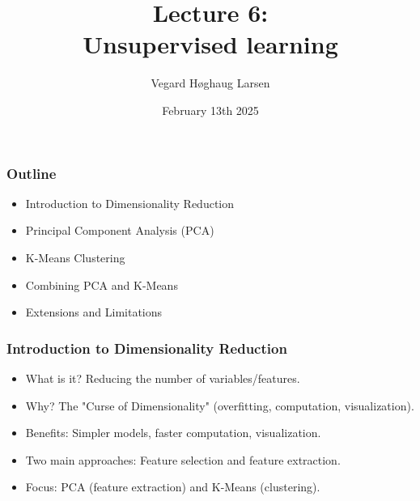 \documentclass[aspectratio=169]{beamer}
\title{Lecture 6:\\ Unsupervised learning}
\institute{GRA4160: Predictive modelling with machine learning}
\date{February 13th 2025}
\author{Vegard H\o ghaug Larsen}
\begin{document}
\maketitle

\begin{frame}
\frametitle{Outline}
\begin{itemize}
    \item Introduction to Dimensionality Reduction
    \item Principal Component Analysis (PCA)
    \item K-Means Clustering
    \item Combining PCA and K-Means
    \item Extensions and Limitations
\end{itemize}
\end{frame}

\begin{frame}
\frametitle{Introduction to Dimensionality Reduction}
\begin{itemize}
    \item What is it?  Reducing the number of variables/features.
    \item Why?  The "Curse of Dimensionality" (overfitting, computation, visualization).
    \item Benefits: Simpler models, faster computation, visualization.
    \item Two main approaches: Feature selection and feature extraction.
    \item Focus: PCA (feature extraction) and K-Means (clustering).
\end{itemize}
\end{frame}

\end{document}
